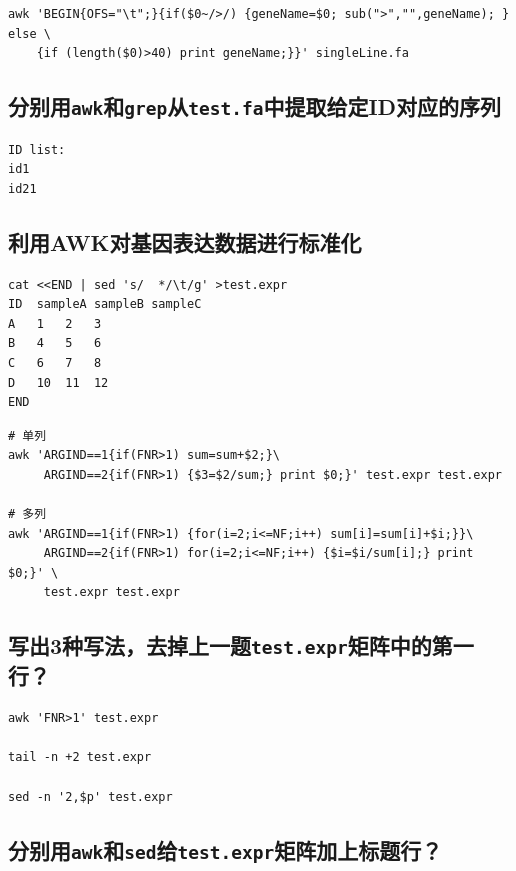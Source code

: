 \documentclass[]{article}
\numberwithin{figure}{section}
\numberwithin{table}{section}
\begin{document}
\begin{verbatim}
awk 'BEGIN{OFS="\t";}{if($0~/>/) {geneName=$0; sub(">","",geneName); } else \
	{if (length($0)>40) print geneName;}}' singleLine.fa
\end{verbatim}

\hypertarget{id_extract}{%
\subsection{\texorpdfstring{分别用\texttt{awk}和\texttt{grep}从\texttt{test.fa}中提取给定ID对应的序列}{分别用awk和grep从test.fa中提取给定ID对应的序列}}\label{id_extract}}

\begin{verbatim}
ID list:
id1
id21
\end{verbatim}

\hypertarget{standard}{%
\subsection{利用AWK对基因表达数据进行标准化}\label{standard}}

\begin{verbatim}
cat <<END | sed 's/  */\t/g' >test.expr
ID	sampleA	sampleB	sampleC
A	1	2	3
B	4	5	6
C	6	7	8
D	10	11	12
END
\end{verbatim}

\begin{verbatim}
# 单列
awk 'ARGIND==1{if(FNR>1) sum=sum+$2;}\
	 ARGIND==2{if(FNR>1) {$3=$2/sum;} print $0;}' test.expr test.expr

# 多列
awk 'ARGIND==1{if(FNR>1) {for(i=2;i<=NF;i++) sum[i]=sum[i]+$i;}}\
	 ARGIND==2{if(FNR>1) for(i=2;i<=NF;i++) {$i=$i/sum[i];} print $0;}' \
	 test.expr test.expr
\end{verbatim}

\hypertarget{skip_first_row}{%
\subsection{\texorpdfstring{写出3种写法，去掉上一题\texttt{test.expr}矩阵中的第一行？}{写出3种写法，去掉上一题test.expr矩阵中的第一行？}}\label{skip_first_row}}

\begin{verbatim}
awk 'FNR>1' test.expr

tail -n +2 test.expr

sed -n '2,$p' test.expr
\end{verbatim}

\hypertarget{add_row}{%
\subsection{\texorpdfstring{分别用\texttt{awk}和\texttt{sed}给\texttt{test.expr}矩阵加上标题行？}{分别用awk和sed给test.expr矩阵加上标题行？}}\label{add_row}}
\end{document}
